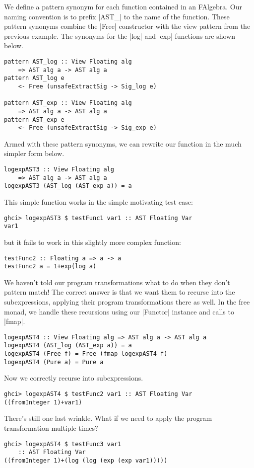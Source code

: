 \documentclass[preprint]{sigplanconf}
\theoremstyle{definition}
\begin{document}
We define a pattern synonym for each function contained in an FAlgebra.
Our naming convention is to prefix |AST_| to the name of the function.
These pattern synonyms combine the |Free| constructor with the view pattern from the previous example.
The synonyms for the |log| and |exp| functions are shown below.
\begin{lstlisting}
pattern AST_log :: View Floating alg
    => AST alg a -> AST alg a
pattern AST_log e
    <- Free (unsafeExtractSig -> Sig_log e)

pattern AST_exp :: View Floating alg
    => AST alg a -> AST alg a
pattern AST_exp e
    <- Free (unsafeExtractSig -> Sig_exp e)
\end{lstlisting}
Armed with these pattern synonyms,
we can rewrite our function in the much simpler form below.
\begin{lstlisting}
logexpAST3 :: View Floating alg
    => AST alg a -> AST alg a
logexpAST3 (AST_log (AST_exp a)) = a
\end{lstlisting}
This simple function works in the simple motivating test case:
\begin{lstlisting}
ghci> logexpAST3 $ testFunc1 var1 :: AST Floating Var
var1
\end{lstlisting}
but it fails to work in this slightly more complex function:
\begin{lstlisting}
testFunc2 :: Floating a => a -> a
testFunc2 a = 1+exp(log a)
\end{lstlisting}
We haven't told our program transformations what to do when they don't pattern match!
The correct answer is that we want them to recurse into the subexpressions,
applying their program transformations there as well.
In the free monad, we handle these recursions using our |Functor| instance and calls to |fmap|.
\begin{lstlisting}
logexpAST4 :: View Floating alg => AST alg a -> AST alg a
logexpAST4 (AST_log (AST_exp a)) = a
logexpAST4 (Free f) = Free (fmap logexpAST4 f)
logexpAST4 (Pure a) = Pure a
\end{lstlisting}
Now we correctly recurse into subexpressions.
\begin{lstlisting}
ghci> logexpAST4 $ testFunc2 var1 :: AST Floating Var
((fromInteger 1)+var1)
\end{lstlisting}
There's still one last wrinkle.
What if we need to apply the program transformation multiple times?
\begin{lstlisting}
ghci> logexpAST4 $ testFunc3 var1
    :: AST Floating Var
((fromInteger 1)+(log (log (exp (exp var1)))))
\end{lstlisting}
\end{document}
